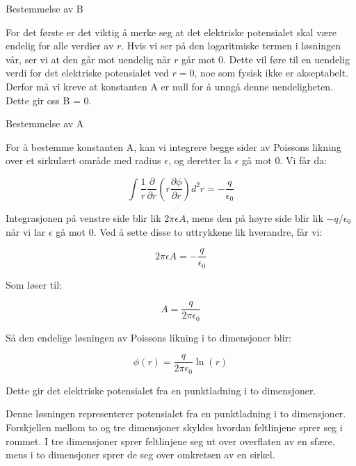 Bestemmelse av B

For det første er det viktig å merke seg at det elektriske potensialet skal være endelig for alle verdier av $r$. Hvis vi ser på den logaritmiske termen i løsningen vår, ser vi at den går mot uendelig når $r$ går mot 0. Dette vil føre til en uendelig verdi for det elektriske potensialet ved $r = 0$, noe som fysisk ikke er akseptabelt. Derfor må vi kreve at konstanten A er null for å unngå denne uendeligheten. Dette gir oss B = 0.

Bestemmelse av A

For å bestemme konstanten A, kan vi integrere begge sider av Poissons likning over et sirkulært område med radius $\epsilon$, og deretter la $\epsilon$ gå mot 0. Vi får da:

\begin{equation}
\int \frac{1}{r} \frac{\partial}{\partial r} \left(r \frac{\partial \phi}{\partial r}\right) d^2r = - \frac{q}{\epsilon_0}
\end{equation}

Integrasjonen på venstre side blir lik $2\pi \epsilon A$, mens den på høyre side blir lik $-q/\epsilon_0$ når vi lar $\epsilon$ gå mot 0. Ved å sette disse to uttrykkene lik hverandre, får vi:

\begin{equation}
2\pi \epsilon A = - \frac{q}{\epsilon_0}
\end{equation}

Som løser til:

\begin{equation}
A = \frac{q}{2\pi\epsilon_0}
\end{equation}

Så den endelige løsningen av Poissons likning i to dimensjoner blir:

\begin{equation}
\phi(r) = \frac{q}{2\pi\epsilon_0} \ln(r)
\end{equation}

Dette gir det elektriske potensialet fra en punktladning i to dimensjoner.

Denne løsningen representerer potensialet fra en punktladning i to dimensjoner. Forskjellen mellom to og tre dimensjoner skyldes hvordan feltlinjene sprer seg i rommet. I tre dimensjoner sprer feltlinjene seg ut over overflaten av en sfære, mens i to dimensjoner sprer de seg over omkretsen av en sirkel.